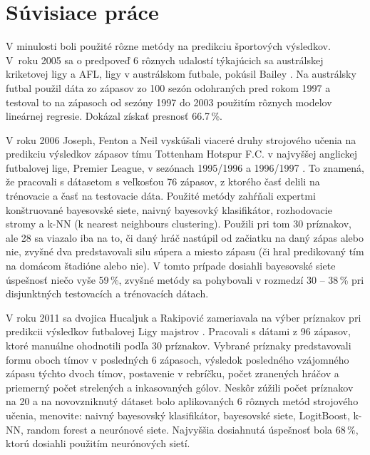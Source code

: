 \section*{Súvisiace práce}

V minulosti boli použité rôzne metódy na predikciu športových výsledkov.
V~roku 2005 sa o predpoveď 6 rôznych udalostí týkajúcich sa austrálskej kriketovej ligy a AFL, ligy v austrálskom futbale, pokúsil Bailey \citep{related:bailey}. 
Na austrálsky futbal použil dáta zo zápasov zo 100 sezón odohraných pred rokom 1997 a testoval to na zápasoch od sezóny 1997 do 2003 použitím rôznych modelov lineárnej regresie. 
Dokázal získať presnosť 66.7\,\%.

V roku 2006 Joseph, Fenton a Neil vyskúšali viaceré druhy strojového učenia na predikciu výsledkov zápasov tímu Tottenham Hotspur F.C. v najvyššej anglickej futbalovej lige, Premier League, v sezónach 1995/1996 a 1996/1997 \citep{related:joseph}.
To znamená, že pracovali s dátasetom s veľkosťou 76 zápasov, z ktorého časť delili na trénovacie a časť na testovacie dáta. 
Použité metódy zahŕňali expertmi konštruované bayesovské siete, naivný bayesovký klasifikátor, rozhodovacie stromy a k-NN (k nearest neighbours clustering). 
Použili pri tom 30 príznakov, ale 28 sa viazalo iba na to, či daný hráč nastúpil od začiatku na daný zápas alebo nie, zvyšné dva predstavovali silu súpera a miesto zápasu (či hral predikovaný tím na domácom štadióne alebo nie).
V tomto prípade dosiahli bayesovské siete úspešnosť niečo vyše 59\,\%, zvyšné metódy sa pohybovali v rozmedzí 30 -- 38\,\% pri disjunktných testovacích a trénovacích dátach.

V roku 2011 sa dvojica Hucaljuk a Rakipovi{\'c} zameriavala na výber príznakov pri predikcii výsledkov futbalovej Ligy majstrov \citep{related:hucaljuk}. 
Pracovali s dátami z 96 zápasov, ktoré manuálne ohodnotili podľa 30 príznakov.
Vybrané príznaky predstavovali formu oboch tímov v posledných 6 zápasoch, výsledok posledného vzájomného zápasu týchto dvoch tímov, postavenie v rebríčku, počet zranených hráčov a priemerný počet strelených a inkasovaných gólov.
Neskôr zúžili počet príznakov na 20 a na novovzniknutý dátaset bolo aplikovaných 6 rôznych metód strojového učenia, menovite: naivný bayesovský klasifikátor, bayesovské siete, LogitBoost, k-NN, random forest a neurónové siete. Najvyššia dosiahnutá úspešnosť bola 68\,\%, ktorú dosiahli použitím neurónových sietí.

